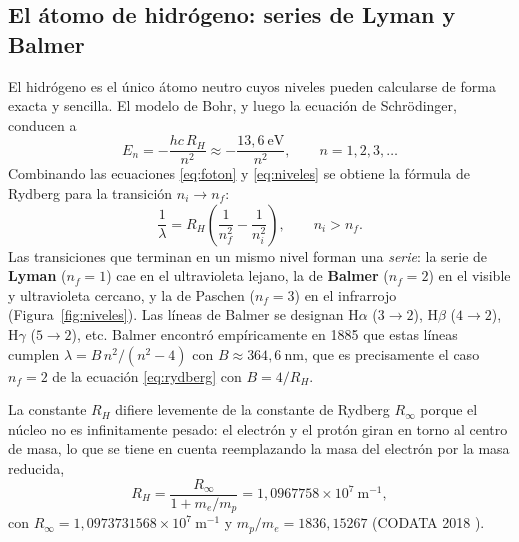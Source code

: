 \documentclass{article}
\newcommand{\nm}{\ \mathrm{nm}}
\begin{document}
\subsection{El átomo de hidrógeno: series de Lyman y Balmer}

El hidrógeno es el único átomo neutro cuyos niveles pueden calcularse de forma exacta y sencilla. El modelo de Bohr, y luego la ecuación de Schrödinger, conducen a \cite{eisberg}
\begin{equation}
    E_n=-\frac{hc\,R_H}{n^2}\approx-\frac{13,6\ \mathrm{eV}}{n^2},\qquad n=1,2,3,\dots
    \label{eq:niveles}
\end{equation}
Combinando las ecuaciones \eqref{eq:foton} y \eqref{eq:niveles} se obtiene la fórmula de Rydberg para la transición $n_i\to n_f$:
\begin{equation}
    \frac{1}{\lambda}=R_H\left(\frac{1}{n_f^2}-\frac{1}{n_i^2}\right),\qquad n_i>n_f.
    \label{eq:rydberg}
\end{equation}
Las transiciones que terminan en un mismo nivel forman una \emph{serie}: la serie de \textbf{Lyman} ($n_f=1$) cae en el ultravioleta lejano, la de \textbf{Balmer} ($n_f=2$) en el visible y ultravioleta cercano, y la de Paschen ($n_f=3$) en el infrarrojo (Figura~\ref{fig:niveles}). Las líneas de Balmer se designan H$\alpha$ ($3\to2$), H$\beta$ ($4\to2$), H$\gamma$ ($5\to2$), etc. Balmer encontró empíricamente en 1885 que estas líneas cumplen $\lambda=B\,n^2/(n^2-4)$ con $B\approx364,6\nm$, que es precisamente el caso $n_f=2$ de la ecuación \eqref{eq:rydberg} con $B=4/R_H$.

La constante $R_H$ difiere levemente de la constante de Rydberg $R_\infty$ porque el núcleo no es infinitamente pesado: el electrón y el protón giran en torno al centro de masa, lo que se tiene en cuenta reemplazando la masa del electrón por la masa reducida,
\begin{equation}
    R_H=\frac{R_\infty}{1+m_e/m_p}=1,0967758\times10^{7}\ \mathrm{m^{-1}},
    \label{eq:RH}
\end{equation}
con $R_\infty=1,0973731568\times10^{7}\ \mathrm{m^{-1}}$ y $m_p/m_e=1836,15267$ (CODATA 2018 \cite{codata}).
\end{document}
